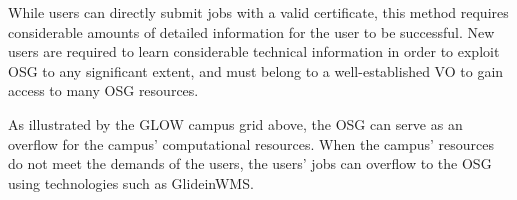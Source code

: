 While users can directly submit jobs with a valid certificate, this method requires considerable amounts of detailed information for the user to be successful.  New users are required to learn considerable technical information in order to exploit OSG to any significant extent, and must belong to a well-established VO to gain access to many OSG resources.

As illustrated by the GLOW campus grid above, the OSG can serve as an overflow for the campus' computational resources.  When the campus' resources do not meet the demands of the users, the users' jobs can overflow to the OSG using technologies such as GlideinWMS.  





